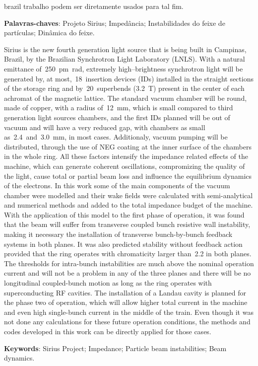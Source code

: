 \begin{otherlanguage*}{brazil}
trabalho podem ser diretamente usados para tal fim.

    \vspace{\onelineskip}
    \noindent\textbf{Palavras-chaves}: Projeto Sirius; Impedância; Instabilidades do feixe de partículas; Dinâmica do feixe.
    \vspace{\fill}
\end{otherlanguage*}
\cleardoublepage

\begin{resumo}
    Sirius is the new fourth generation light source that is being built in Campinas, Brazil, by the Brazilian Synchrotron Light Laboratory (LNLS). With a natural emittance of~\SI{250}{\pico\meter\radian}, extremely high--brightness synchrotron light will be generated by, at most,~\num{18}~insertion devices (IDs) installed in the straight sections of the storage ring and by~\num{20}~superbends (\SI{3.2}{\tesla}) present in the center of each achromat of the magnetic lattice. The standard vacuum chamber will be round, made of copper, with a radius of~\SI{12}{\milli\meter}, which is small compared to third generation light sources chambers, and the first IDs planned will be out of vacuum and will have a very reduced gap, with chambers as small as~\num{2.4}~and~\SI{3.0}{\milli\meter}, in most cases. Additionaly, vacuum pumping will be distributed, through the use of NEG coating at the inner surface of the chambers in the whole ring. All these factors intensify the impedance related effects of the machine, which can generate coherent oscillations, compromizing the quality of the light, cause total or partial beam loss and influence the equilibrium dynamics of the electrons. In this work some of the main components of the vacuum chamber were modelled and their wake fields were calculated with semi-analytical and numerical methods and added to the total impedance budget of the machine. With the application of this model to the first phase of operation, it was found that the beam will suffer from transverse coupled bunch resistive wall instability, making it necessary the installation of transverse bunch-by-bunch feedback systems in both planes. It was also predicted stability without feedback action provided that the ring operates with chromaticity larger than~\num{2.2} in both planes. The thresholds for intra-bunch instabilities are much above the nominal operation current and will not be a problem in any of the three planes and there will be no longitudinal coupled-bunch motion as long as the ring operates with superconducting RF cavities. The installation of a Landau cavity is planned for the phase two of operation, which will allow higher total current in the machine and even high single-bunch current in the middle of the train. Even though it was not done any calculations for these future operation conditions, the methods and codes developed in this work can be directly applied for those cases.

    \noindent\textbf{Keywords}: Sirius Project; Impedance; Particle beam instabilities; Beam dynamics.
    \vspace{\fill}
\end{resumo}

